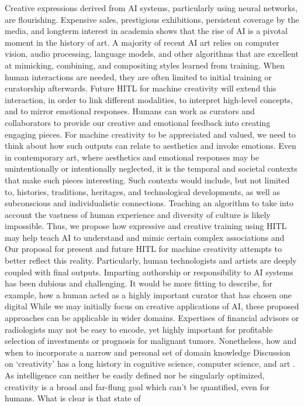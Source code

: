 \documentclass[letterpaper]{article} %
\begin{document}
Creative expressions derived from AI systems, particularly using neural networks, are flourishing. Expensive sales, prestigious exhibitions, persistent coverage by the media, and longterm interest in academia shows that the rise of AI is a pivotal moment in the history of art. A majority of recent AI art relies on computer vision, audio processing, language models, and other algorithms that are excellent at mimicking, combining, and compositing styles learned from training. When human interactions are needed, they are often limited to initial training or curatorship afterwards. Future HITL for machine creativity will extend this interaction, in order to link different modalities, to interpret high-level concepts, and to mirror emotional responses. Humans can work as curators and collaborators to provide our creative and emotional feedback into creating engaging pieces.  For machine creativity to be appreciated and valued, we need to think about how such outputs can relate to aesthetics and invoke emotions. Even in contemporary art, where aesthetics and emotional responses may be unintentionally or intentionally neglected, it is the temporal and societal contexts that make such pieces interesting. Such contexts would include, but not limited to, histories, traditions, heritages, and technological developments, as well as subconscious and individualistic connections. Teaching an algorithm to take into account the vastness of human experience and diversity of culture is likely impossible. Thus, we propose how expressive and creative training using HITL may help teach AI to understand and mimic certain complex associations and  Our proposal for present and future HITL for machine creativity attempts to better reflect this reality. Particularly, human technologists and artists are deeply coupled with final outputs. Imparting authorship or responsibility to AI systems has been dubious and challenging. It would be more fitting to describe, for example, how a human acted as a highly important curator that has chosen one digital  While we may initially focus on creative applications of AI, these proposed approaches can be applicable in wider domains. Expertises of financial advisors or radiologists may not be easy to encode, yet highly important for profitable selection of investments or prognosis for malignant tumors. Nonetheless, how and when to incorporate a narrow and personal set of domain knowledge  Discussion on `creativity' has a long history in cognitive science, computer science, and art \cite[e.g.,][]{Cohen1979, Wilson1983, Boden1996, Nake1998}. As intelligence can neither be easily defined nor be singularly optimized, creativity is a broad and far-flung goal which can't be quantified, even for humans. What is clear is that state of

\clearpage

\end{document}
